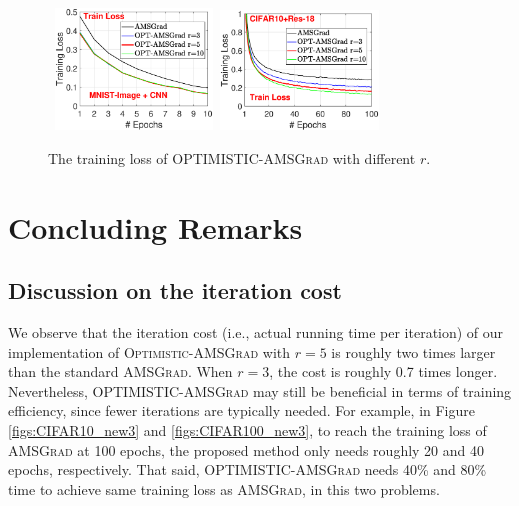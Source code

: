 \documentclass[11pt]{article}
\theoremstyle{k}
\begin{document}
\begin{figure}[]
\begin{center}
\mbox{
\includegraphics[width=1.65in]{./new_figure/new_mnist_img_figure/mnist_img_train_loss_r3510_2.eps}\hspace{-0.1in}
\includegraphics[width=1.65in]{./new_figure/cifar10_train_loss_r3510.eps}
}
\end{center}
\vspace{-0.1in}
\caption{The training loss of \textsc{OPTIMISTIC-AMSGrad} with different $r$.}     \label{fig:compare-r}
\end{figure}


\section{Concluding Remarks}
\subsection{Discussion on the iteration cost}

We observe that the iteration cost (i.e., actual running time per iteration) of our implementation of \textsc{Optimistic-AMSGrad} with $r=5$ is roughly two times larger than the standard \textsc{AMSGrad}. When $r=3$, the cost is roughly 0.7 times longer. Nevertheless, \textsc{OPTIMISTIC-AMSGrad} may still be beneficial in terms of training efficiency, since fewer iterations are typically needed. For example, in Figure \ref{figs:CIFAR10_new3} and \ref{figs:CIFAR100_new3}, to reach the training loss of \textsc{AMSGrad} at 100 epochs, the proposed method only needs roughly 20 and 40 epochs, respectively. That said, \textsc{OPTIMISTIC-AMSGrad} needs 40\% and 80\% time to achieve same training loss as \textsc{AMSGrad}, in this two problems.
\end{document}
